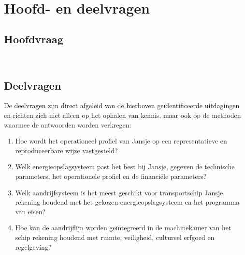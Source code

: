 \section{Hoofd- en deelvragen}

\subsection{Hoofdvraag}
 \\


\subsection{Deelvragen}

\noindent De deelvragen zijn direct afgeleid van de hierboven geïdentificeerde uitdagingen en richten zich niet alleen op het ophalen van kennis, maar ook op de methoden waarmee de antwoorden worden verkregen:

\begin{enumerate}
    \item Hoe wordt het operationeel profiel van Jansje op een representatieve en reproduceerbare wijze vastgesteld?
    \item Welk energieopslagsysteem past het best bij Jansje, gegeven de technische parameters, het operationele profiel en  de financiële parameters?
    \item Welk aandrijfsysteem is het meest geschikt voor transportschip Jansje, rekening houdend met het gekozen energieopslagsysteem en het programma van eisen?
    \item Hoe kan de aandrijflijn worden geïntegreerd in de machinekamer van het schip rekening houdend met ruimte, veiligheid, cultureel erfgoed en regelgeving?
\end{enumerate}

